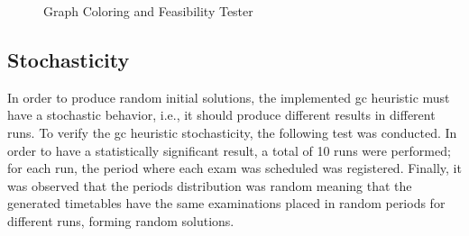 \begin{figure}[p!]

\caption{Graph Coloring and Feasibility Tester} \label{fig:GraphColoring}
\end{figure}


\subsection{Stochasticity}

In order to produce random initial solutions, the implemented \gls{gc} heuristic must have a stochastic behavior, i.e., it should produce different results in different runs. To verify the \gls{gc} heuristic stochasticity, the following test was conducted. In order to have a statistically significant result, a total of 10 runs were performed; for each run, the period where each exam was scheduled was registered. Finally, it was observed that the periods distribution was random meaning that the generated timetables have the same examinations placed in random periods for different runs, forming random solutions.

